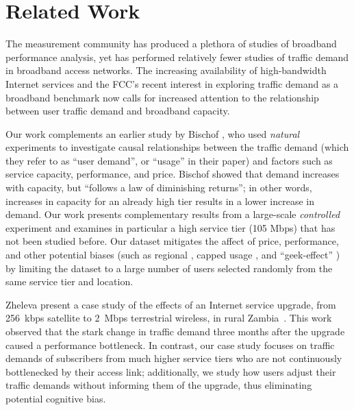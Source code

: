 \section{Related Work}\label{sec:related}

The measurement community has produced a plethora of studies of
broadband performance analysis, yet has performed relatively fewer
studies of traffic demand in broadband access networks.
The increasing availability of high-bandwidth Internet services and the
FCC's recent interest in exploring traffic  
demand as a broadband benchmark \cite{fcc2015progress-report} now calls
for increased attention to the relationship between user traffic demand
and broadband capacity.

Our work complements an earlier study by Bischof \ea \cite{dasu-imc2014},
who used {\em natural} experiments to investigate causal relationships between  
the traffic demand (which they refer to as ``user demand'', or ``usage''
in their paper) 
and factors such as service capacity, performance, and price. Bischof \ea showed 
that demand increases with capacity, but ``follows a law of diminishing  
returns''; in other words, increases in capacity for an already high
tier results in a lower 
increase in demand.
Our work presents complementary results from a large-scale {\em
  controlled} experiment and examines in particular a high service tier
(105 Mbps) that has not been studied before. Our dataset mitigates the
affect of price, performance, and other potential biases (such as
regional \cite{dasu-weather, dasu-region}, capped usage
\cite{youre-capped}, and ``geek-effect'' \cite{dasu-imc2014}) by
limiting the dataset to a large number of users selected randomly from
the same service tier and location.

Zheleva \ea present a case study of the effects of an Internet service
upgrade, from 256~kbps satellite to 2~Mbps terrestrial wireless, in
rural Zambia~\cite{zheleva2013}.  This work observed that the stark change in traffic
demand three months after the upgrade caused a performance
bottleneck. In contrast, our case study focuses on traffic demands of
subscribers from much higher service tiers who are not continuously
bottlenecked by their access link; additionally, we study how users
adjust their traffic demands without informing them of the upgrade, thus
eliminating potential cognitive bias.


